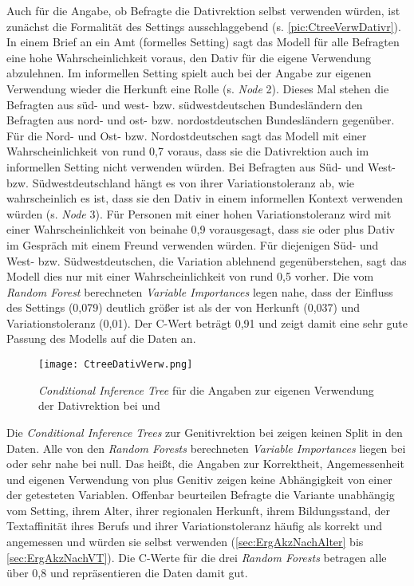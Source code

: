 Auch für die Angabe, ob Befragte die Dativrektion selbst verwenden würden, ist zunächst die Formalität des Settings ausschlaggebend (s. \autoref{pic:CtreeVerwDativr}). 
In einem Brief an ein Amt (formelles Setting) sagt das Modell für alle Befragten eine hohe Wahrscheinlichkeit voraus, den Dativ für die eigene Verwendung abzulehnen. 
Im informellen Setting spielt auch bei der Angabe zur eigenen Verwendung wieder die Herkunft eine Rolle (s. \textit{Node} 2). 
Dieses Mal stehen die Befragten aus süd- und west- bzw. südwestdeutschen Bundesländern den Befragten aus nord- und ost- bzw. nordostdeutschen Bundesländern gegenüber.
Für die Nord- und Ost- bzw. Nordostdeutschen sagt das Modell mit einer Wahrscheinlichkeit von rund 0,7 voraus, dass sie die Dativrektion auch im informellen Setting nicht verwenden würden. 
Bei Befragten aus Süd- und West- bzw. Südwestdeutschland hängt es von ihrer Variationstoleranz ab, wie wahrscheinlich es ist, dass sie den Dativ in einem informellen Kontext verwenden würden (s. \textit{Node} 3). 
Für Personen mit einer hohen Variationstoleranz wird mit einer Wahrscheinlichkeit von beinahe 0,9 vorausgesagt, dass sie \wegen{} oder \waehrend{} plus Dativ im Gespräch mit einem Freund verwenden würden. 
Für diejenigen Süd- und West- bzw. Südwestdeutschen, die Variation ablehnend gegenüberstehen, sagt das Modell dies nur mit einer Wahrscheinlichkeit von rund 0,5 vorher. 
Die vom \textit{Random Forest} berechneten \textit{Variable Importances} legen nahe, dass der Einfluss des Settings (0,079) deutlich größer ist als der von Herkunft (0,037) und Variationstoleranz (0,01). 
Der C-Wert beträgt 0,91 und zeigt damit eine sehr gute Passung des Modells auf die Daten an. 
\begin{figure}[p]
\centering
\texttt{[image: CtreeDativVerw.png]}
\caption{\textit{Conditional Inference Tree} für die Angaben zur eigenen Verwendung der Dativrektion bei \wegen{} und \waehrend}
\label{pic:CtreeVerwDativr}
\end{figure}

Die \textit{Conditional Inference Trees} zur Genitivrektion bei \dank{} zeigen keinen Split in den Daten.
Alle von den \textit{Random Forests} berechneten \textit{Variable Importances} liegen bei oder sehr nahe bei null.
Das heißt, die Angaben zur Korrektheit, Angemessenheit und eigenen Verwendung von \dank{} plus Genitiv zeigen keine Abhängigkeit von einer der getesteten Variablen. 
Offenbar beurteilen Befragte die Variante unabhängig vom Setting, ihrem Alter, ihrer regionalen Herkunft, ihrem Bildungsstand, der Textaffinität ihres Berufs und ihrer Variationstoleranz häufig als korrekt und angemessen und würden sie selbst verwenden (\autoref{sec:ErgAkzNachAlter} bis \autoref{sec:ErgAkzNachVT}). 
Die C-Werte für die drei \textit{Random Forests} betragen alle über 0,8 und repräsentieren die Daten damit gut.

